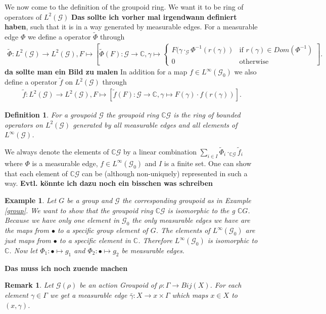 \documentclass[12pt,a4paper]{scrartcl}
\newtheorem{Definition}[Theorem]{Definition}
\newtheorem{Example}[Theorem]{Example}
\newtheorem{Remark}[Theorem]{Remark}
\numberwithin{equation}{section}
\newcommand{\C}{\mathbb{C}} %
\newcommand{\2}{\mathbb{Z} / 2 \mathbb{Z}}
\newcommand{\G}{\mathcal{G}}
\newcommand{\1}{\overline{1}}
\newcommand{\0}{\overline{0}}
\begin{document}
We now come to the definition of the groupoid ring. We want it to be ring of operators of $L^2(\G)$ \textbf{Das sollte ich vorher mal irgendwann definiert haben}, such that it is in a way generated by measurable edges. For a measurable edge $\Phi$ we define a operator $\tilde \Phi$ through
\begin{align*}
	\tilde \Phi: L^2(\G) \to L^2(\G), F \mapsto \left[ \tilde \Phi (F): \G \to \C, \gamma \mapsto \begin{cases}
	F(\gamma \cdot_{\G} \Phi^{-1}(r(\gamma)) & \text{if } r(\gamma) \in Dom(\Phi^{-1}) \\
	0 & \text{otherwise}
	\end{cases} \right] .
\end{align*}
\textbf{da sollte man ein Bild zu malen}
In addition for a map $f \in L^\infty (\G_0)$ we also define a operator $\tilde f$ on $L^2(\G)$ through
\begin{align*}
	\tilde f: L^2(\G) \to L^2(\G), F \mapsto [\tilde f(F): \G \to \C, \gamma \mapsto F(\gamma) \cdot f(r(\gamma))].
\end{align*}
\begin{Definition}
	For a groupoid $\G$ the groupoid ring $\C\G$ is the ring of bounded operators on $L^2(\G)$ generated by all measurable edges and all elements of $L^\infty(\G)$.
\end{Definition}
We always denote the elements of $\C\G$ by a linear combination $\sum_{i \in I} \tilde \Phi_i \cdot_{\C \G} \tilde f_i$ where $\Phi$ is a measurable edge, $f \in L^\infty(\G_0)$ and $I$ is a finite set. One can show that each element of $\C \G$ can be (although non-uniquely) represented in such a way. \textbf{Evtl. könnte ich dazu noch ein bisschen was schreiben}
\begin{Example}
	Let $G$ be a group and $\G$ the corresponding groupoid as in Example \ref{group}. We want to show that the groupoid ring $\C \G$ is isomorphic to the g $\C G$. Because we have only one element in $\G_0$ the only measurable edges we have are the maps from $\bullet$ to a specific group element of $G$. The elements of $L^\infty(\G_0)$ are just maps from $\bullet$ to a specific element in $\C$. Therefore  $L^\infty(\G_0)$ is isomorphic to $\C$. Now let $\Phi_1: \bullet \mapsto g_1$ and $\Phi_2: \bullet \mapsto g_2$ be measurable edges. 
\end{Example}
\textbf{Das muss ich noch zuende machen}
\begin{Remark}
	Let $\G(\rho)$ be an action Groupoid of $\rho: \Gamma \to Bij(X)$. For each element $\gamma \in \Gamma$ we get a measurable edge $\bar{\gamma}: X \to x \times \Gamma$ which maps $x \in X$ to $(x, \gamma)$.
\end{Remark}
\end{document}
